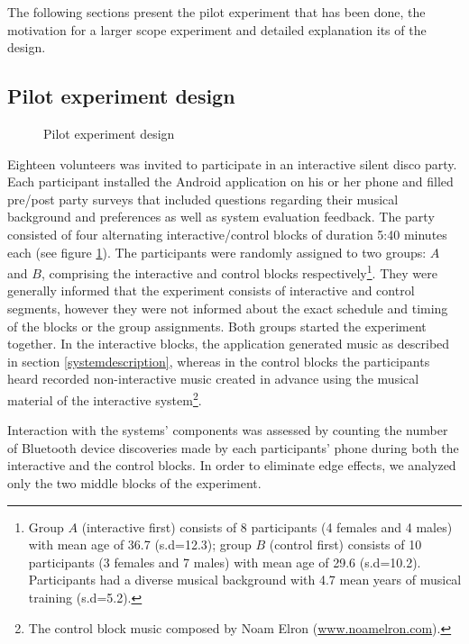 \documentclass[a4paper,11pt]{article}
\begin{document}
{The following sections present the pilot experiment that has been done, the motivation for a larger scope experiment and detailed explanation its of the design.

\subsection{Pilot experiment design}

\begin{figure}[!htb]
	\centering
	\def\svgwidth{0.95\columnwidth}
  	
	\caption{Pilot experiment design}\label{fig:pilot}
\end{figure}

Eighteen volunteers was invited to participate in an interactive silent disco party.
Each participant installed the Android application on his or her phone and filled pre/post party surveys that included questions regarding their musical background and preferences as well as system evaluation feedback.
The party consisted of four alternating interactive/control blocks of duration 5:40 minutes each (see figure \ref{fig:pilot}).
The participants were randomly assigned to two groups: $A$ and $B$, comprising the interactive and control blocks respectively\footnote{Group $A$ (interactive first) consists of 8 participants (4 females and 4 males) with mean age of 36.7 (s.d=12.3); group $B$ (control first) consists of 10 participants (3 females and 7 males) with mean age of 29.6 (s.d=10.2). Participants had a diverse musical background with 4.7 mean years of musical training (s.d=5.2).}.
They were generally informed that the experiment consists of interactive and control segments, however they were not informed about the exact schedule and timing of the blocks or the group assignments.
Both groups started the experiment together.
In the interactive blocks, the application generated music as described in section \ref{systemdescription}, whereas in the control blocks the participants heard recorded non-interactive music created in advance using the musical material of the interactive system\footnote{The control block music composed by Noam Elron (\href{http://www.noamelron.com}{www.noamelron.com}).}.

Interaction with the systems' components was assessed by counting the number of Bluetooth device discoveries made by each participants' phone during both the interactive and the control blocks.
In order to eliminate edge effects, we analyzed only the two middle blocks of the experiment.

}
\end{document}
